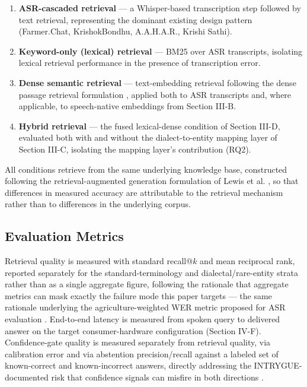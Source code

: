 \documentclass[conference]{IEEEtran}
\begin{document}
\begin{enumerate}
    \item \textbf{ASR-cascaded retrieval} --- a Whisper-based \cite{radford2023whisper} transcription step followed by text retrieval, representing the dominant existing design pattern (Farmer.Chat, KrishokBondhu, A.A.H.A.R., Krishi Sathi).
    \item \textbf{Keyword-only (lexical) retrieval} --- BM25 over ASR transcripts, isolating lexical retrieval performance in the presence of transcription error.
    \item \textbf{Dense semantic retrieval} --- text-embedding retrieval following the dense passage retrieval formulation \cite{karpukhin2020dpr}, applied both to ASR transcripts and, where applicable, to speech-native embeddings from Section III-B.
    \item \textbf{Hybrid retrieval} --- the fused lexical-dense condition of Section III-D, evaluated both with and without the dialect-to-entity mapping layer of Section III-C, isolating the mapping layer's contribution (RQ2).
\end{enumerate}

All conditions retrieve from the same underlying knowledge base, constructed following the retrieval-augmented generation formulation of Lewis et al. \cite{lewis2020rag}, so that differences in measured accuracy are attributable to the retrieval mechanism rather than to differences in the underlying corpus.

\subsection{Evaluation Metrics}
Retrieval quality is measured with standard recall@$k$ and mean reciprocal rank, reported separately for the standard-terminology and dialectal/rare-entity strata rather than as a single aggregate figure, following the rationale that aggregate metrics can mask exactly the failure mode this paper targets --- the same rationale underlying the agriculture-weighted WER metric proposed for ASR evaluation \cite{benchmarkingasr2026}. End-to-end latency is measured from spoken query to delivered answer on the target consumer-hardware configuration (Section IV-F). Confidence-gate quality is measured separately from retrieval quality, via calibration error and via abstention precision/recall against a labeled set of known-correct and known-incorrect answers, directly addressing the INTRYGUE-documented risk that confidence signals can misfire in both directions \cite{intrygue2026}.
\end{document}

